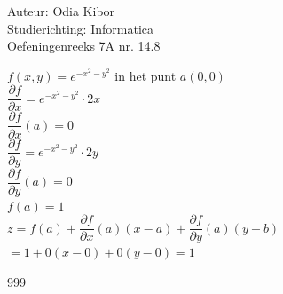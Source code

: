 \documentclass[a4paper]{article}
\begin{document}
  
\noindent \large Auteur: Odia Kibor \\
\noindent \large Studierichting: Informatica\\
\noindent \large Oefeningenreeks 7A nr. 14.8
\\

\medskip

\normalsize


$f(x,y) = e^{-x^2-y^2}$ in het punt $a(0,0)$\\

$\dfrac{\partial f}{\partial x} = e^{-x^2-y^2}\cdot 2x$\\

$\dfrac{\partial f}{\partial x}(a) = 0$\\

$\dfrac{\partial f}{\partial y} = e^{-x^2-y^2}\cdot 2y$\\

$\dfrac{\partial f}{\partial y}(a) = 0$\\

$f(a) = 1$\\

$z = f(a) + \dfrac{\partial f}{\partial x}(a)(x-a) + \dfrac{\partial f}{\partial y}(a)(y-b)$\\

$= 1 + 0(x - 0) + 0(y - 0) = 1$\\




















\begin{thebibliography}{999}
\end{thebibliography}
\end{document}
